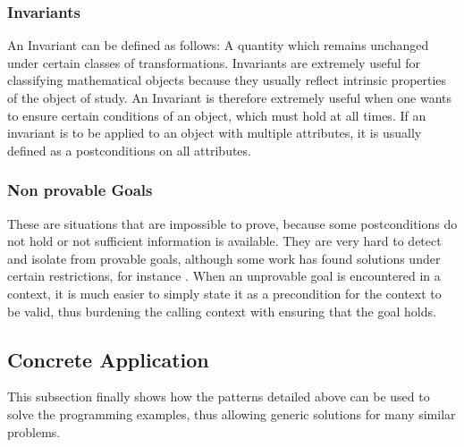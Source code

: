 \subsubsection{Invariants} \label{invariants}
An Invariant can be defined as follows: A quantity which remains unchanged under certain classes of transformations. Invariants are extremely useful for classifying mathematical objects because they usually reflect intrinsic properties of the object of study.\cite[282ff]{hunt}
\newline An Invariant is therefore extremely useful when one wants to ensure certain conditions of an object, which must hold at all times. If an invariant is to be applied to an object with multiple attributes, it is usually defined as a postconditions on all attributes. 

\subsubsection{Non provable Goals} \label{non provable goal}
These are situations that are impossible to prove, because some postconditions do not hold or not sufficient information is available. They are very hard to detect and isolate from provable goals, although some work has found solutions under certain restrictions, for instance \cite{goals}. When an unprovable goal is encountered in a context, it is much easier to simply state it as a precondition for the context to be valid, thus burdening the calling context with ensuring that the goal holds. 

\subsection{Concrete Application}
This subsection finally shows how the patterns detailed above can be used to solve the programming examples, thus allowing generic solutions for many similar problems.

